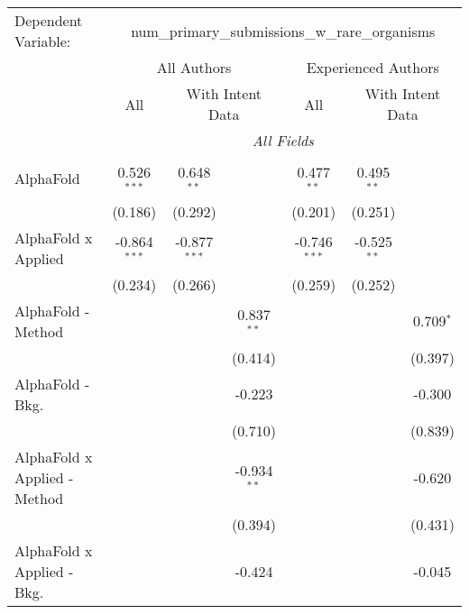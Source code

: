 \begingroup
\centering
\begin{tabular}{lcccccc}
   \tabularnewline \midrule \midrule
   Dependent Variable: & \multicolumn{6}{c}{num\_primary\_submissions\_w\_rare\_organisms}\\
 & \multicolumn{3}{c}{All Authors} & \multicolumn{3}{c}{Experienced Authors} \\
\cmidrule(lr){2-4} \cmidrule(lr){5-7}
 & \multicolumn{1}{c}{All} & \multicolumn{2}{c}{With Intent Data} & \multicolumn{1}{c}{All} & \multicolumn{2}{c}{With Intent Data} \\
\cmidrule(lr){2-2} \cmidrule(lr){3-4} \cmidrule(lr){5-5} \cmidrule(lr){6-7}
 & \multicolumn{6}{c}{\textit{All Fields}} \\ \\
   AlphaFold                      & 0.526$^{***}$  & 0.648$^{**}$   &               & 0.477$^{**}$   & 0.495$^{**}$  &   \\   
                                  & (0.186)        & (0.292)        &               & (0.201)        & (0.251)       &   \\   
   AlphaFold x Applied            & -0.864$^{***}$ & -0.877$^{***}$ &               & -0.746$^{***}$ & -0.525$^{**}$ &   \\   
                                  & (0.234)        & (0.266)        &               & (0.259)        & (0.252)       &   \\   
   AlphaFold - Method             &                &                & 0.837$^{**}$  &                &               & 0.709$^{*}$\\   
                                  &                &                & (0.414)       &                &               & (0.397)\\   
   AlphaFold - Bkg.               &                &                & -0.223        &                &               & -0.300\\   
                                  &                &                & (0.710)       &                &               & (0.839)\\   
   AlphaFold x Applied - Method   &                &                & -0.934$^{**}$ &                &               & -0.620\\   
                                  &                &                & (0.394)       &                &               & (0.431)\\   
   AlphaFold x Applied - Bkg.     &                &                & -0.424        &                &               & -0.045\\   

\end{tabular}

